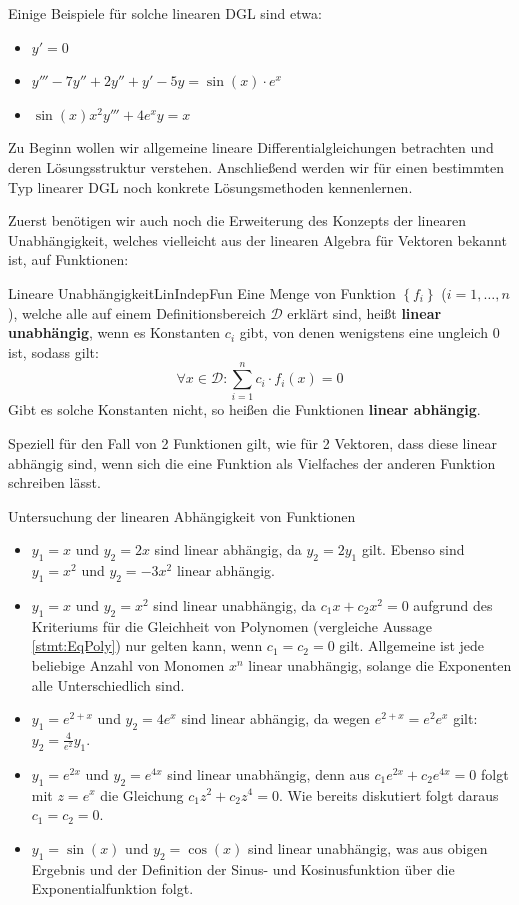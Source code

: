 Einige Beispiele für solche linearen DGL sind etwa:

\begin{itemize}
    \item $y'=0$
    \item $y'''-7y''+2y''+y'-5y=\sin(x)\cdot e^x$
    \item $\sin(x)x^2y'''+4e^x y = x$
\end{itemize}

Zu Beginn wollen wir allgemeine lineare Differentialgleichungen betrachten und deren Lösungsstruktur verstehen. Anschließend werden wir für einen bestimmten Typ linearer DGL noch konkrete Lösungsmethoden kennenlernen.

Zuerst benötigen wir auch noch die Erweiterung des Konzepts der linearen Unabhängigkeit, welches vielleicht aus der linearen Algebra für Vektoren bekannt ist, auf Funktionen:

\begin{definition}{Lineare Unabhängigkeit}{LinIndepFun}
    Eine Menge von Funktion $\left\lbrace f_i \right\rbrace$ ($i=1,\dots,n$), welche alle auf einem Definitionsbereich $\mathcal{D}$ erklärt sind, heißt \textbf{linear unabhängig}, wenn es Konstanten $c_i$ gibt, von denen wenigstens eine ungleich $0$ ist, sodass gilt:
    $$
        \forall x \in \mathcal{D}: \sum\limits_{i=1}^n c_i \cdot f_i(x) = 0
    $$
    Gibt es solche Konstanten nicht, so heißen die Funktionen \textbf{linear abhängig}.
\end{definition}

Speziell für den Fall von 2 Funktionen gilt, wie für 2 Vektoren, dass diese linear abhängig sind, wenn sich die eine Funktion als Vielfaches der anderen Funktion schreiben lässt.

\begin{example}{Untersuchung der linearen Abhängigkeit von Funktionen}{}
    \begin{itemize}
        \item $y_1=x$ und $y_2=2x$ sind linear abhängig, da $y_2 = 2 y_1$ gilt. Ebenso sind $y_1=x^2$ und $y_2=-3x^2$ linear abhängig.
        \item $y_1=x$ und $y_2=x^2$ sind linear unabhängig, da $c_1 x + c_2 x^2 = 0$ aufgrund des Kriteriums für die Gleichheit von Polynomen (vergleiche Aussage \ref{stmt:EqPoly}) nur gelten kann, wenn $c_1=c_2=0$ gilt. Allgemeine ist jede beliebige Anzahl von Monomen $x^n$ linear unabhängig, solange die Exponenten alle Unterschiedlich sind.
        \item $y_1=e^{2+x}$ und $y_2=4e^x$ sind linear abhängig, da wegen $e^{2+x} = e^2 e^x$ gilt: $y_2 = \frac{4}{e^2} y_1$.
        \item $y_1=e^{2x}$ und $y_2=e^{4x}$ sind linear unabhängig, denn aus $c_1 e^{2x} + c_2 e^{4x}=0$ folgt mit $z=e^x$ die Gleichung $c_1 z^2 + c_2 z^4 = 0$. Wie bereits diskutiert folgt daraus $c_1=c_2=0$.
        \item $y_1=\sin(x)$ und $y_2 = \cos(x)$ sind linear unabhängig, was aus obigen Ergebnis und der Definition der Sinus- und Kosinusfunktion über die Exponentialfunktion folgt.
    \end{itemize}
\end{example}

